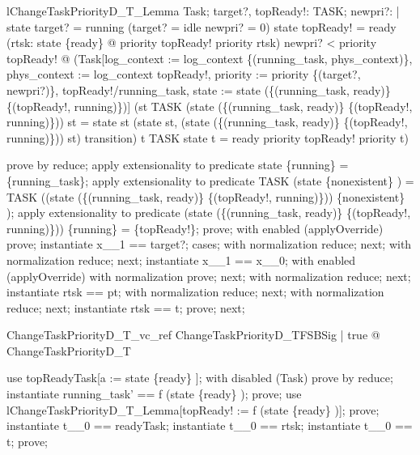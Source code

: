 \begin{theorem}{lChangeTaskPriorityD\_T\_Lemma}
\forall  Task; target?, topReady!: TASK; newpri?: \nat  | state target? = running \land  (target? = idle \implies  newpri? = 0) \land  state topReady! = ready \land  (\forall  rtsk: state \inv  \limg  \{ready\} \rimg  @ priority topReady! \geq  priority rtsk) \land  newpri? < priority topReady! @ \lnot  (Task[log\_context := log\_context \oplus  \{(running\_task, phys\_context)\}, phys\_context := log\_context topReady!, priority := priority \oplus  \{(target?, newpri?)\}, topReady!/running\_task, state := state \oplus  (\{(running\_task, ready)\} \cup  \{(topReady!, running)\})] \land  (st \in  TASK \land  \lnot  (state \oplus  (\{(running\_task, ready)\} \cup  \{(topReady!, running)\})) st = state st \implies  (state st, (state \oplus  (\{(running\_task, ready)\} \cup  \{(topReady!, running)\})) st) \in  transition) \implies  t \in  TASK \land  state t = ready \land  \lnot  priority topReady! \geq  priority t)
\end{theorem}

\begin{zproof}
prove by reduce;
apply extensionality to predicate state \inv  \limg  \{running\} \rimg  = \{running\_task\};
apply extensionality to predicate TASK \setminus  (state \inv  \limg  \{nonexistent\} \rimg ) = TASK \setminus  ((state \oplus  (\{(running\_task, ready)\} \cup  \{(topReady!, running)\})) \inv  \limg  \{nonexistent\} \rimg );
apply extensionality to predicate (state \oplus  (\{(running\_task, ready)\} \cup  \{(topReady!, running)\})) \inv  \limg  \{running\} \rimg  = \{topReady!\};
prove;
with enabled (applyOverride) prove;
instantiate x\_\_1 == target?;
cases;
with normalization reduce;
next;
with normalization reduce;
next;
instantiate x\_\_1 == x\_\_0;
with enabled (applyOverride) with normalization prove;
next;
with normalization reduce;
next;
instantiate rtsk == pt;
with normalization reduce;
next;
with normalization reduce;
next;
instantiate rtsk == t;
prove;
next;
\end{zproof}

\begin{theorem}{ChangeTaskPriorityD\_T\_vc\_ref}
\forall  ChangeTaskPriorityD\_TFSBSig | true @ \pre  ChangeTaskPriorityD\_T
\end{theorem}

\begin{zproof}
use topReadyTask[a := state \inv  \limg  \{ready\} \rimg ];
with disabled (Task) prove by reduce;
instantiate running\_task' == f (state \inv  \limg  \{ready\} \rimg );
prove;
use lChangeTaskPriorityD\_T\_Lemma[topReady! := f (state \inv  \limg  \{ready\} \rimg )];
prove;
instantiate t\_\_0 == readyTask;
instantiate t\_\_0 == rtsk;
instantiate t\_\_0 == t;
prove;
\end{zproof}

